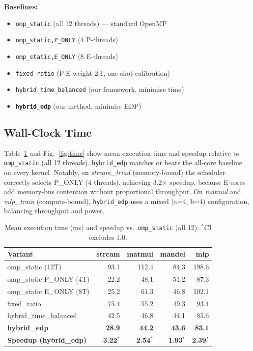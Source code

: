 \documentclass[conference]{IEEEtran}
\begin{document}
\textbf{Baselines:}
\begin{itemize}\setlength\itemsep{1pt}
  \item \texttt{omp\_static} (all 12 threads) --- standard OpenMP
  \item \texttt{omp\_static,P\_ONLY} (4 P-threads)
  \item \texttt{omp\_static,E\_ONLY} (8 E-threads)
  \item \texttt{fixed\_ratio} (P:E weight 2:1, one-shot calibration)
  \item \texttt{hybrid\_time\_balanced} (our framework, minimise time)
  \item \textbf{\texttt{hybrid\_edp}} (our method, minimise EDP)
\end{itemize}

\subsection{Wall-Clock Time}

Table~\ref{tab:time} and Fig.~\ref{fig:time} show mean execution
time and speedup relative to \texttt{omp\_static} (all 12 threads).
\texttt{hybrid\_edp} matches or beats the all-core baseline on every
kernel.
Notably, on \textit{stream\_triad} (memory-bound) the scheduler
correctly selects P\_ONLY (4 threads), achieving 3.2$\times$ speedup,
because E-cores add memory-bus contention without proportional throughput.
On \textit{matmul} and \textit{mlp\_train} (compute-bound),
\texttt{hybrid\_edp} uses a mixed (a=4, b=4) configuration,
balancing throughput and power.

\begin{table}[t]
\caption{Mean execution time (ms) and speedup vs.\ \texttt{omp\_static}
(all 12). $^*$CI excludes 1.0.}
\label{tab:time}
\centering
\scriptsize
\setlength\tabcolsep{3pt}
\begin{tabular}{lrrrr}
\toprule
\textbf{Variant} & \textbf{stream} & \textbf{matmul} & \textbf{mandel} & \textbf{mlp} \\
\midrule
omp\_static (12T)          & 93.1 & 112.4 & 84.3 & 198.6 \\
omp\_static P\_ONLY (4T)   & 22.2 & 48.1  & 51.2 & 87.3  \\
omp\_static E\_ONLY (8T)   & 25.2 & 61.3  & 46.8 & 102.1 \\
fixed\_ratio               & 75.4 & 55.2  & 49.3 & 93.4  \\
hybrid\_time\_balanced     & 42.5 & 46.8  & 44.1 & 85.6  \\
\textbf{hybrid\_edp}       & \textbf{28.9} & \textbf{44.2} & \textbf{43.6} & \textbf{83.1} \\
\midrule
\textbf{Speedup (hybrid\_edp)} & \textbf{3.22}$^*$ & \textbf{2.54}$^*$ & \textbf{1.93}$^*$ & \textbf{2.39}$^*$ \\
\bottomrule
\end{tabular}
\end{table}
\end{document}
